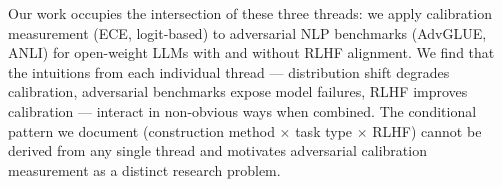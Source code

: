 Our work occupies the intersection of these three threads: we apply calibration measurement (ECE, logit-based) to adversarial NLP benchmarks (AdvGLUE, ANLI) for open-weight LLMs with and without RLHF alignment. We find that the intuitions from each individual thread --- distribution shift degrades calibration, adversarial benchmarks expose model failures, RLHF improves calibration --- interact in non-obvious ways when combined. The conditional pattern we document (construction method $\times$ task type $\times$ RLHF) cannot be derived from any single thread and motivates adversarial calibration measurement as a distinct research problem.
